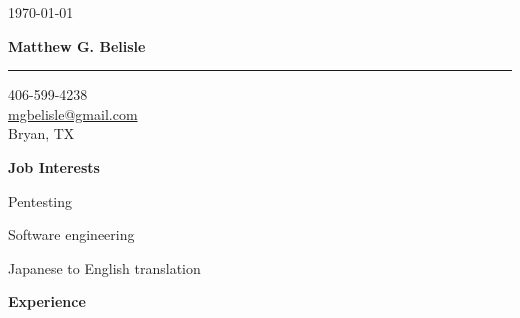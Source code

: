 \documentclass[10pt, a4paper]{article}
\begin{document}
\thispagestyle{empty}
\begin{flushright}
\small \today
\end{flushright}
\begin{center}
\textbf{\Large Matthew G. Belisle}
\rule{\linewidth}{0.5mm}
\end{center}
\begin{flushright}
\begin{minipage}[h]{0.25\linewidth}\small
\begin{flushleft}
406-599-4238\\
\href{mailto:mgbelisle@gmail.com}{mgbelisle@gmail.com}\\
Bryan, TX
\end{flushleft}
\end{minipage}
\end{flushright}
\textbf{Job Interests}
\begin{itemize*}
  \item Pentesting
  \item Software engineering
  \item Japanese to English translation
\end{itemize*}
\textbf{Experience}
\end{document}
